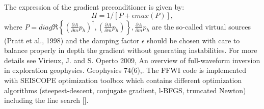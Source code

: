 The expression of the gradient preconditioner is given by:
\begin{equation}
H = 1/ [P + \epsilon max(P)],
\end{equation}
where $P = diag \Re \left\lbrace (\frac{\partial A}{\partial m}p_h)^{\dagger}, (\frac{\partial A}{\partial m}p_h)\right\rbrace, \frac{\partial A}{\partial m}p_h$ are the so-called virtual sources  (Pratt et al., 1998) and the
damping factor $\epsilon$ should be chosen with care to balance properly in depth the gradient without generating
instabilities. For more details see Virieux, J. and S. Operto 2009, An overview of full-waveform inversion in exploration geophysics. Geophysics 74(6),.
The FFWI code is implemented with SEISCOPE optimization toolbox which contains different optimization algorithms (steepest-descent, conjugate gradient, l-BFGS, truncated Newton) including the line search [].

